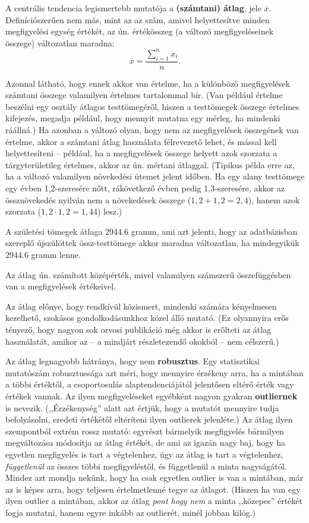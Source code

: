 \documentclass[
]{book}
\begin{document}
A centrális tendencia legismertebb mutatója a \textbf{(számtani) átlag}, jele \(\overline{x}\). Definíciószerűen nem más, mint az az szám, amivel helyettesítve minden megfigyelési egység értékét, az ún. értékösszeg (a változó megfigyeléseinek összege) változatlan maradna:
\[
    \overline{x}=\frac{\sum_{i=1}^n x_i}{n}.
\]

Azonnal látható, hogy ennek akkor van értelme, ha a különböző megfigyelések számtani összege valamilyen értelmes tartalommal bír. (Van például értelme beszélni egy osztály átlagos testtömegéről, hiszen a testtömegek összege értelmes kifejezés, megadja például, hogy mennyit mutatna egy mérleg, ha mindenki ráállná.) Ha azonban a változó olyan, hogy nem az megfigyelések összegének van értelme, akkor a számtani átlag használata félrevezető lehet, és mással kell helyettesíteni -- például, ha a megfigyelések összege helyett azok szorzata a tárgyterületileg értelmes, akkor az ún. mértani átlaggal. (Tipikus példa erre az, ha a változó valamilyen növekedési ütemet jelent időben. Ha egy alany testtömege egy évben 1,2-szeresére nőtt, rákövetkező évben pedig 1,3-szeresére, akkor az össznövekedés nyilván nem a növekedések összege (\(1,\!2 + 1,\!2 = 2,\!4\)), hanem azok szorzata (\(1,\!2 \cdot 1,\!2 = 1,\!44\)) lesz.)

A születési tömegek átlaga 2944.6 gramm, ami azt jelenti, hogy az adatbázisban szereplő újszülöttek össz-testtömege akkor maradna változatlan, ha mindegyikük 2944.6 gramm lenne.

Az átlag ún. számított középérték, mivel valamilyen számszerű összefüggésben van a megfigyelések értékeivel.

Az átlag előnye, hogy rendkívül közismert, mindenki számára kényelmesen kezelhető, szokásos gondolkodásunkhoz közel álló mutató. (Ez olyannyira erős tényező, hogy nagyon sok orvosi publikáció még akkor is erőlteti az átlag használatát, amikor az -- a mindjárt részletezendő okokból -- nem célszerű.)

Az átlag legnagyobb hátránya, hogy nem \textbf{robusztus}. Egy statisztikai mutatószám robusztussága azt méri, hogy mennyire érzékeny arra, ha a mintában a többi értéktől, a csoportosulás alaptendenciájától jelentősen eltérő érték vagy értékek vannak. Az ilyen megfigyeléseket egyébként nagyon gyakran \textbf{outliernek} is nevezik. (,,Érzékenység'' alatt azt értjük, hogy a mutatót mennyire tudja befolyásolni, eredeti értékétől eltéríteni ilyen outlierek jelenléte.) Az átlag ilyen szempontból extrém rossz mutató: egyrészt bármelyik megfigyelés bármilyen megváltozása módosítja az átlag értékét, de ami az igazán nagy baj, hogy ha egyetlen megfigyelés is tart a végtelenhez, úgy az átlag is tart a végtelenhez, \emph{függetlenül} az összes többi megfigyeléstől, és függetlenül a minta nagyságától. Mindez azt mondja nekünk, hogy ha csak egyetlen outlier is van a mintában, már az is képes arra, hogy teljesen értelmetlenné tegye az átlagot. (Hiszen ha van egy ilyen outlier a mintában, akkor az átlag \emph{pont hogy nem} a minta ,,közepes'' értékét fogja mutatni, hanem egyre inkább az outlierét, minél jobban kilóg.)
\end{document}

